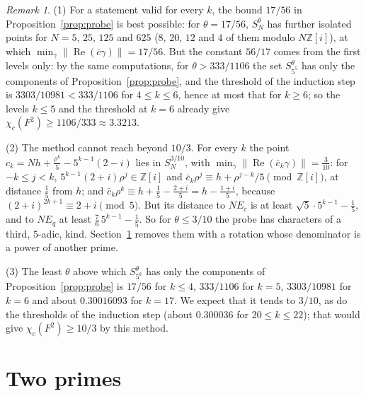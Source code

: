 \documentclass[11pt,a4paper]{amsart}
\theoremstyle{remark}
\newtheorem*{remark}{Remark}
\newcommand{\Z}{\mathbb{Z}}
\begin{document}
\begin{remark}
(1) For a statement valid for every $k$, the bound $17/56$ in Proposition~\ref{prop:probe} is best possible: for
$\theta=17/56$, $S_N^\theta$ has further isolated points for $N=5$, $25$, $125$ and $625$ ($8$, $20$, $12$ and $4$
of them modulo $N\Z[i]$), at which $\min_\gamma\|\operatorname{Re}(\bar c\gamma)\|=17/56$. But the constant $56/17$
comes from the first levels only: by the same computations, for $\theta>333/1106$ the set $S_{5^5}^\theta$ has only
the components of Proposition~\ref{prop:probe}, and the threshold of the induction step is $3303/10981<333/1106$ for
$4\le k\le6$, hence at most that for $k\ge6$; so the levels $k\le5$ and the threshold at $k=6$ already give
$\chi_c(F^2)\ge1106/333\approx3.3213$.

(2) The method cannot reach beyond $10/3$. For every $k$ the point $c_k=Nh+\frac{\rho^k}5-5^{k-1}(2-i)$ lies in
$S_N^{3/10}$, with $\min_\gamma\|\operatorname{Re}(\bar c_k\gamma)\|=\frac3{10}$: for $-k\le j<k$,
$5^{k-1}(2+i)\rho^j\in\Z[i]$ and $\bar c_k\rho^j\equiv h+\rho^{j-k}/5\pmod{\Z[i]}$, at distance $\frac15$ from
$h$; and $\bar c_k\rho^k\equiv h+\frac15-\frac{2+i}5=h-\frac{1+i}5$, because $(2+i)^{2k+1}\equiv2+i\pmod5$. But its distance to
$NE_c$ is at least $\sqrt5\cdot5^{k-1}-\frac15$, and to $NE_q$ at least $\frac76\,5^{k-1}-\frac15$. So for
$\theta\le3/10$ the probe has characters of a third, $5$-adic, kind. Section~\ref{sec:twoprimes} removes them with a
rotation whose denominator is a power of another prime.

(3) The least $\theta$ above which $S_{5^k}^\theta$ has only the components of Proposition~\ref{prop:probe} is
$17/56$ for $k\le4$, $333/1106$ for $k=5$, $3303/10981$ for $k=6$ and about $0.30016093$ for $k=17$. We expect that it
tends to $3/10$, as do the thresholds of the induction step (about $0.300036$ for $20\le k\le22$); that would give
$\chi_c(F^2)\ge10/3$ by this method.
\end{remark}

\section{Two primes}\label{sec:twoprimes}
\end{document}
